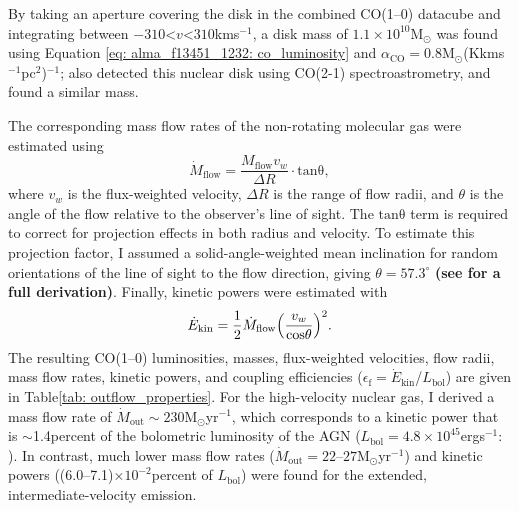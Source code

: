 By taking an aperture covering the disk in the combined CO(1--0) datacube and integrating between $-310$\;\textless\;$v$\;\textless\;$310$\;km\;s$^{-1}$, a disk mass of $1.1\times10^{10}$\;M$_\odot$ was found using Equation \ref{eq: alma_f13451_1232: co_luminosity} and $\alpha_\mathrm{CO}=0.8$\;M$_\odot$\;(K\;km\;s$^{-1}$\;pc$^2$)$^{-1}$; \citet{Lamperti2022} also detected this nuclear disk using CO(2-1) spectroastrometry, and found a similar mass.

The corresponding mass flow rates of the non-rotating molecular gas were estimated using
\begin{equation}
    \dot{M}_\mathrm{flow} = \frac{M_\mathrm{flow}v_w}{\Delta R} \cdot \mathrm{tan\theta},
\end{equation}
where $v_w$ is the flux-weighted velocity, $\Delta R$ is the range of flow radii, and $\theta$ is the angle of the flow relative to the observer's line of sight. The $\mathrm{tan\theta}$ term is required to correct for projection effects in both radius and velocity. To estimate this projection factor, I assumed a solid-angle-weighted mean inclination for random orientations of the line of sight to the flow direction, giving $\theta=57.3^\circ$ \textbf{(see \citealt{Law2009} for a full derivation)}. Finally, kinetic powers were estimated with
\begin{equation}
    \dot{E}_\mathrm{kin}=\frac{1}{2}\dot{M}_\mathrm{flow}\Bigl(\frac{v_w}{\mathrm{cos\theta}}\Bigl)^2.
    \label{eq: alma_f13451_1232: kinetic_power}
\end{equation}
The resulting CO(1--0) luminosities, masses, flux-weighted velocities, flow radii, mass flow rates, kinetic powers, and coupling efficiencies ($\epsilon_\mathrm{f}=\dot{E}_\mathrm{kin}$/$L_\mathrm{bol}$) are given in Table\;\ref{tab: outflow_properties}. For the high-velocity nuclear gas, I derived a mass flow rate of $\dot{M}_\mathrm{out}\sim230$\;M$_\odot$\;yr$^{-1}$, which corresponds to a kinetic power that is $\sim$1.4\;per\;cent of the bolometric luminosity of the AGN ($L_\mathrm{bol}=4.8\times10^{45}$\;erg\;s$^{-1}$: \citealt{Rose2018}). In contrast, much lower mass flow rates ($\dot{M}_\mathrm{out}=22$--$27$\;M$_\odot$\;yr$^{-1}$) and kinetic powers ((6.0--7.1)$\times10^{-2}$\;per\;cent of $L_\mathrm{bol}$) were found for the extended, intermediate-velocity emission.

